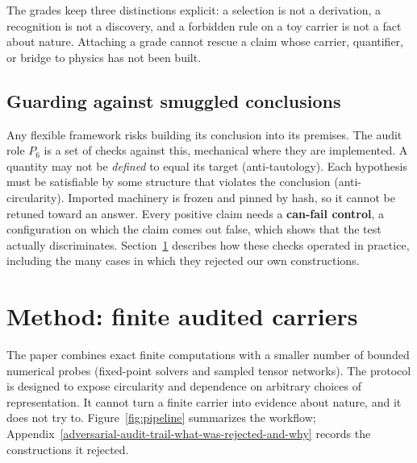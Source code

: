 \documentclass[11pt]{article}
\theoremstyle{definition}
\begin{document}
The grades keep three distinctions explicit: a selection is not a derivation, a recognition is not a discovery, and a
forbidden rule on a toy carrier is not a fact about nature. Attaching a grade cannot rescue a claim whose carrier,
quantifier, or bridge to physics has not been built.

\subsection{Guarding against smuggled conclusions}\label{the-anti-smuggling-discipline}

Any flexible framework risks building its conclusion into its premises. The audit role \(P_6\) is a set of checks
against this, mechanical where they are implemented. A quantity may not be \emph{defined} to equal its target
(anti-tautology). Each hypothesis must be satisfiable by some structure that violates the conclusion
(anti-circularity). Imported machinery is frozen and pinned by hash, so it cannot be retuned toward an answer. Every
positive claim needs a \textbf{can-fail control}, a configuration on which the claim comes out false, which shows that
the test actually discriminates. Section~\ref{method-finite-audited-carriers-adversarial-self-correction} describes how
these checks operated in practice, including the many cases in which they rejected our own constructions.
 \section{Method: finite audited carriers}\label{method-finite-audited-carriers-adversarial-self-correction}

The paper combines exact finite computations with a smaller number of bounded numerical probes (fixed-point solvers
and sampled tensor networks). The protocol is designed to expose circularity and dependence on arbitrary choices of
representation. It cannot turn a finite carrier into evidence about nature, and it does not try to.
Figure~\ref{fig:pipeline} summarizes the workflow; Appendix~\ref{adversarial-audit-trail-what-was-rejected-and-why}
records the constructions it rejected.
\end{document}
